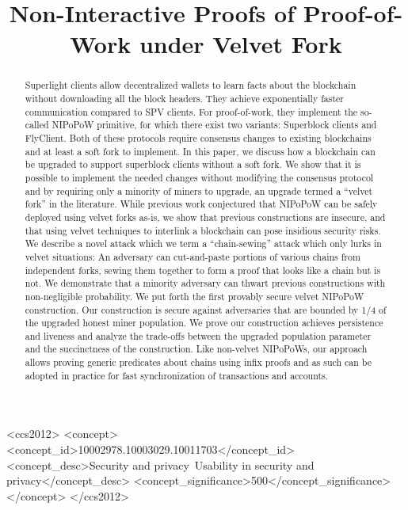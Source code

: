 \documentclass[sigconf, anonymous]{acmart}
\theoremstyle{plain}
\theoremstyle{definition}
\begin{document}
\title{Non-Interactive Proofs of Proof-of-Work under Velvet Fork} %

\begin{abstract}
Superlight clients allow decentralized wallets to learn facts about the blockchain without downloading all the block headers. They achieve exponentially faster communication compared to SPV clients. For proof-of-work, they implement the so-called NIPoPoW primitive, for which there exist two variants: Superblock clients and FlyClient. Both of these protocols require consensus changes to existing blockchains and at least a soft fork to implement. In this paper, we discuss how a blockchain can be upgraded to support superblock clients without a soft fork. We show that it is possible to implement the needed changes without modifying the consensus protocol and by requiring only a minority of miners to upgrade, an upgrade termed a ``velvet fork'' in the literature. While previous work conjectured that NIPoPoW can be safely deployed using velvet forks as-is, we show that previous constructions are insecure, and that using velvet techniques to interlink a blockchain can pose insidious security risks. We describe a novel attack which we term a ``chain-sewing'' attack which only lurks in velvet situations: An adversary can cut-and-paste portions of various chains from independent forks, sewing them together to form a proof that looks like a chain but is not. We demonstrate that a minority adversary can thwart previous constructions with non-negligible probability. We put forth the first provably secure velvet NIPoPoW construction. Our construction is secure against adversaries that are bounded by 1/4 of the upgraded honest miner population. We prove our construction achieves persistence and liveness and analyze the trade-offs between the upgraded population parameter and the succinctness of the construction. Like non-velvet NIPoPoWs, our approach allows proving generic predicates about chains using infix proofs and as such can be adopted in practice for fast synchronization of transactions and accounts.
\end{abstract}

\begin{CCSXML}
<ccs2012>
<concept>
<concept_id>10002978.10003029.10011703</concept_id>
<concept_desc>Security and privacy~Usability in security and privacy</concept_desc>
<concept_significance>500</concept_significance>
</concept>
</ccs2012>
\end{CCSXML}



\maketitle





\end{document}
